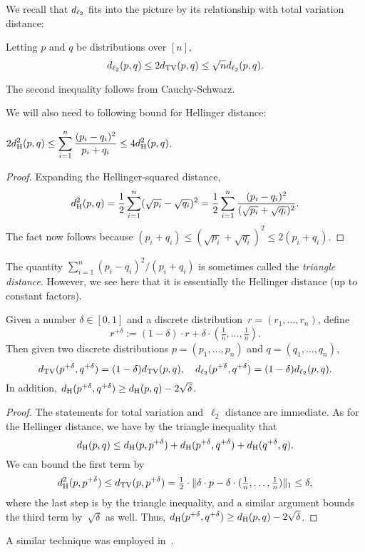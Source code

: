 We recall that $d_{\ell_2}$ fits into the picture by its relationship with total variation distance:
\begin{proposition}
\label{prop:ltinequalities}
Letting $p$ and $q$ be distributions over $[n]$,
$$d_{\ell_2}(p,q) \leq 2d_{\mathrm {TV}}(p,q) \leq \sqrt{n}d_{\ell_2}(p,q).$$
\end{proposition}
The second inequality follows from Cauchy-Schwarz.

We will also need to following bound for Hellinger distance:
\begin{proposition}\label{prp:didnt-know-it-was-hellinger}
$\displaystyle 2 d_{\mathrm {H}}^2(p,q) \leq \sum_{i=1}^n \frac{(p_i - q_i)^2}{p_i+q_i} \leq 4d_{\mathrm {H}}^2(p,q)$.
\end{proposition}
\begin{proof}
Expanding the Hellinger-squared distance,
\begin{equation*}
d_{\mathrm {H}}^2(p,q) = \frac12 \sum_{i=1}^n (\sqrt{p_i} - \sqrt{q_i})^2 = \frac12 \sum_{i=1}^n \frac{(p_i-q_i)^2}{(\sqrt{p_i}+\sqrt{q_i})^2}.
\end{equation*}
The fact now follows because $(p_i + q_i) \leq (\sqrt{p_i}+\sqrt{q_i})^2 \leq 2(p_i + q_i)$.
\end{proof}
\noindent
The quantity $\sum_{i=1}^n (p_i-q_i)^2/(p_i+q_i)$ is sometimes called the \emph{triangle distance}.
However, we see here that it is essentially the Hellinger distance (up to constant factors).

\begin{proposition}\label{prop:mixing}
Given a number $\delta \in [0,1]$ and a discrete distribution~$r  = (r_1, \ldots, r_n)$, define
\begin{equation*}
r^{+\delta} := (1-\delta) \cdot r + \delta \cdot (\tfrac{1}{n} , \ldots, \tfrac{1}{n}).
\end{equation*}
Then given two discrete distributions $p=(p_1, \ldots, p_n)$ and $q=(q_1, \ldots, q_n)$,
\begin{equation*}
d_{\mathrm {TV}}(p^{+\delta}, q^{+\delta}) = (1-\delta) d_{\mathrm {TV}}(p,q),
\quad
d_{\ell_2}(p^{+\delta},q^{+\delta})= (1-\delta) d_{\ell_2}(p,q).
\end{equation*}
In addition, $d_{\mathrm {H}}(p^{+\delta},q^{+\delta}) \geq d_{\mathrm {H}}(p,q) - 2\sqrt{\delta}$.
\end{proposition}
\begin{proof}
The statements for total variation and~$\ell_2$ distance are immediate.  As for the Hellinger distance, we have by the triangle inequality that
\begin{equation*}
d_{\mathrm {H}}(p,q) \leq d_{\mathrm {H}}(p,p^{+\delta}) + d_{\mathrm {H}}(p^{+\delta},q^{+\delta}) + d_{\mathrm {H}}(q^{+\delta},q).
\end{equation*}
We can bound the first term by
\begin{equation*}
d_{\mathrm {H}}^2(p,p^{+\delta})
\leq d_{\mathrm {TV}}( p, p^{+\delta})
= \tfrac{1}{2} \cdot\Vert \delta \cdot p - \delta \cdot (\tfrac{1}{n}, \ldots, \tfrac{1}{n}) \Vert_1
\leq \delta,
\end{equation*}
where the last step is by the triangle inequality,
and a similar argument bounds the third term by~$\sqrt{\delta}$ as well.
Thus, $d_{\mathrm {H}}(p^{+\delta},q^{+\delta}) \geq d_{\mathrm {H}}(p,q) - 2\sqrt{\delta}$.
\end{proof}
A similar technique was employed in~\cite{Goldreich16}.

